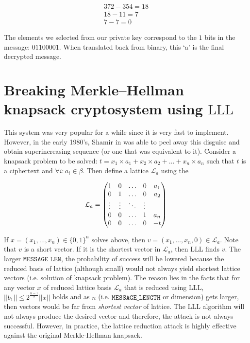 \begin{gather*}
372 - 354 = 18\\
18 - 11 = 7\\
7 - 7 = 0
\end{gather*}


The elements we selected from our private key correspond to the $1$ bits in the message: $\text{01100001}$. When translated back from binary, this `a' is the final decrypted message.


\section*{Breaking Merkle–Hellman knapsack cryptosystem using \texorpdfstring{$\mathrm{LLL}$}{LLL}}
This system was very popular for a while since it is very fast to implement. However, in the early 1980's, Shamir in \cite{Shamir:1982:PTA:1382436.1382749} was able to peel away this disguise and obtain superincreasing sequence (or one that was equivalent to it). Consider a knapsack problem to be solved:
$t = x_1\times a_1 + x_2 \times a_2 + \dots + x_n \times a_n$ such that $t$ is a ciphertext and $\forall i: a_i \in \beta$. Then define a lattice $\mathcal{L}_a$ using the 

\begin{align}
    \centering
    \mathcal{L}_a =
    \begin{pmatrix}
        1 &  0  & \ldots &0 & a_{1}\\
        0 &  1  & \ldots &0 & a_{2}\\
        \vdots  & \vdots & \ddots & \vdots\\
        0 &  0  & \ldots &1  & a_{n}\\
        0 &  0  & \ldots &0 & -t
    \end{pmatrix}
\end{align}

If $x = (x_1, \dots, x_n) \in \{0, 1\}^{n}$ solves above, then $v = (x_1, \dots, x_n, 0) \in \mathcal{L}_a$. Note that $v$ is a short vector. If it is the shortest vector in $\mathcal{L}_a$, then $\mathrm{LLL}$ finds $v$. The larger $\texttt{MESSAGE\_LEN}$, the probability of success will be lowered because the reduced basis of lattice (although small) would not always yield shortest lattice vectors (i.e. solution of knapsack problem). The reason lies in the facts that for any vector $x$ of reduced lattice basis $\mathcal{L}_a$ that is reduced using $\mathrm{LLL}$, $||b_1|| \le 2^{\frac{n-1}{2}}  ||x||$ holds and as $n$ (i.e. $\texttt{MESSAGE\_LENGTH}$ or dimension) gets larger, then vectors would be far from \textit{shortest vector} of lattice. The $\mathrm{LLL}$ algorithm will not always produce the desired vector and therefore, the attack is not always successful. However, in practice, the lattice reduction attack is highly effective against the original Merkle-Hellman knapsack.

